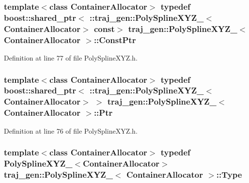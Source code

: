\subsubsection[{\texorpdfstring{Const\+Ptr}{ConstPtr}}]{\setlength{\rightskip}{0pt plus 5cm}template$<$class Container\+Allocator$>$ typedef boost\+::shared\+\_\+ptr$<$ \+::{\bf traj\+\_\+gen\+::\+Poly\+Spline\+X\+Y\+Z\+\_\+}$<$Container\+Allocator$>$ const$>$ {\bf traj\+\_\+gen\+::\+Poly\+Spline\+X\+Y\+Z\+\_\+}$<$ Container\+Allocator $>$\+::{\bf Const\+Ptr}}\hypertarget{structtraj__gen_1_1_poly_spline_x_y_z___abe05b1cea8a30ca9f6f4279e9f0f5da6}{}\label{structtraj__gen_1_1_poly_spline_x_y_z___abe05b1cea8a30ca9f6f4279e9f0f5da6}


Definition at line 77 of file Poly\+Spline\+X\+Y\+Z.\+h.

\subsubsection[{\texorpdfstring{Ptr}{Ptr}}]{\setlength{\rightskip}{0pt plus 5cm}template$<$class Container\+Allocator$>$ typedef boost\+::shared\+\_\+ptr$<$ \+::{\bf traj\+\_\+gen\+::\+Poly\+Spline\+X\+Y\+Z\+\_\+}$<$Container\+Allocator$>$ $>$ {\bf traj\+\_\+gen\+::\+Poly\+Spline\+X\+Y\+Z\+\_\+}$<$ Container\+Allocator $>$\+::{\bf Ptr}}\hypertarget{structtraj__gen_1_1_poly_spline_x_y_z___a90af1068efc9032c5640f140c5c2cd71}{}\label{structtraj__gen_1_1_poly_spline_x_y_z___a90af1068efc9032c5640f140c5c2cd71}


Definition at line 76 of file Poly\+Spline\+X\+Y\+Z.\+h.

\subsubsection[{\texorpdfstring{Type}{Type}}]{\setlength{\rightskip}{0pt plus 5cm}template$<$class Container\+Allocator$>$ typedef {\bf Poly\+Spline\+X\+Y\+Z\+\_\+}$<$Container\+Allocator$>$ {\bf traj\+\_\+gen\+::\+Poly\+Spline\+X\+Y\+Z\+\_\+}$<$ Container\+Allocator $>$\+::{\bf Type}}\hypertarget{structtraj__gen_1_1_poly_spline_x_y_z___aa6abcb08736e40614837f5c2abe2969a}{}\label{structtraj__gen_1_1_poly_spline_x_y_z___aa6abcb08736e40614837f5c2abe2969a}


